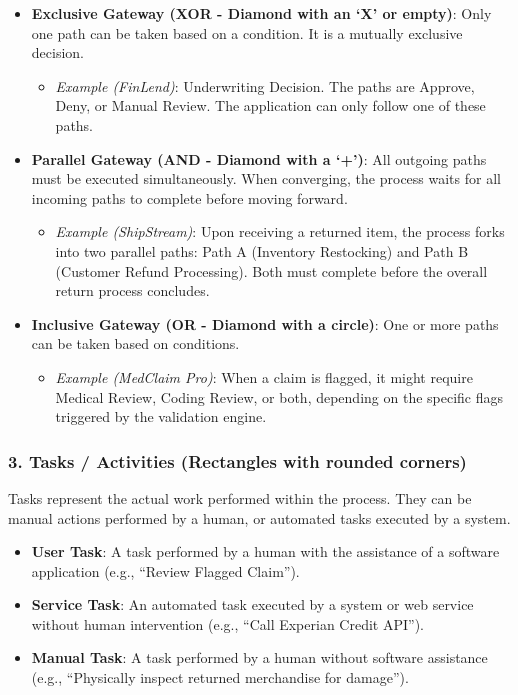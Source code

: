 \documentclass[
  11pt,
  openany,
  oneside]{book}
\providecommand{\tightlist}{%
  \setlength{\itemsep}{0pt}\setlength{\parskip}{0pt}}
\begin{document}
\begin{itemize}
\tightlist
\item
  \textbf{Exclusive Gateway (XOR - Diamond with an `X' or empty)}: Only
  one path can be taken based on a condition. It is a mutually exclusive
  decision.

  \begin{itemize}
  \tightlist
  \item
    \emph{Example (FinLend)}: Underwriting Decision. The paths are
    Approve, Deny, or Manual Review. The application can only follow one
    of these paths.
  \end{itemize}
\item
  \textbf{Parallel Gateway (AND - Diamond with a `+')}: All outgoing
  paths must be executed simultaneously. When converging, the process
  waits for all incoming paths to complete before moving forward.

  \begin{itemize}
  \tightlist
  \item
    \emph{Example (ShipStream)}: Upon receiving a returned item, the
    process forks into two parallel paths: Path A (Inventory Restocking)
    and Path B (Customer Refund Processing). Both must complete before
    the overall return process concludes.
  \end{itemize}
\item
  \textbf{Inclusive Gateway (OR - Diamond with a circle)}: One or more
  paths can be taken based on conditions.

  \begin{itemize}
  \tightlist
  \item
    \emph{Example (MedClaim Pro)}: When a claim is flagged, it might
    require Medical Review, Coding Review, or both, depending on the
    specific flags triggered by the validation engine.
  \end{itemize}
\end{itemize}

\subsubsection{3. Tasks / Activities (Rectangles with rounded
corners)}\label{tasks-activities-rectangles-with-rounded-corners}

Tasks represent the actual work performed within the process. They can
be manual actions performed by a human, or automated tasks executed by a
system.

\begin{itemize}
\tightlist
\item
  \textbf{User Task}: A task performed by a human with the assistance of
  a software application (e.g., ``Review Flagged Claim'').
\item
  \textbf{Service Task}: An automated task executed by a system or web
  service without human intervention (e.g., ``Call Experian Credit
  API'').
\item
  \textbf{Manual Task}: A task performed by a human without software
  assistance (e.g., ``Physically inspect returned merchandise for
  damage'').
\end{itemize}
\end{document}
